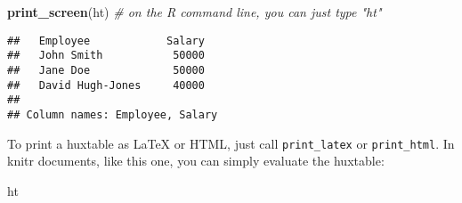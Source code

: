 \documentclass[]{article}
\newenvironment{Shaded}{\begin{snugshade}}{\end{snugshade}}
\newcommand{\CommentTok}[1]{\textcolor[rgb]{0.56,0.35,0.01}{\textit{#1}}}
\newcommand{\KeywordTok}[1]{\textcolor[rgb]{0.13,0.29,0.53}{\textbf{#1}}}
\newcommand{\NormalTok}[1]{#1}
\begin{document}
\begin{Shaded}
\begin{Highlighting}[]
\KeywordTok{print_screen}\NormalTok{(ht)     }\CommentTok{# on the R command line, you can just type "ht"}
\end{Highlighting}
\end{Shaded}

\begin{verbatim}
##   Employee            Salary  
##   John Smith           50000  
##   Jane Doe             50000  
##   David Hugh-Jones     40000  
## 
## Column names: Employee, Salary
\end{verbatim}

\FloatBarrier

To print a huxtable as LaTeX or HTML, just call \texttt{print\_latex} or
\texttt{print\_html}. In knitr documents, like this one, you can simply
evaluate the huxtable:

\begin{Shaded}
\begin{Highlighting}[]
\NormalTok{ht}
\end{Highlighting}
\end{Shaded}

 
  \providecommand{\huxb}[2]{\arrayrulecolor[RGB]{#1}\global\arrayrulewidth=#2pt}
  \providecommand{\huxvb}[2]{\color[RGB]{#1}\vrule width #2pt}
  \providecommand{\huxtpad}[1]{\rule{0pt}{\baselineskip+#1}}
  \providecommand{\huxbpad}[1]{\rule[-#1]{0pt}{#1}}
\end{document}
